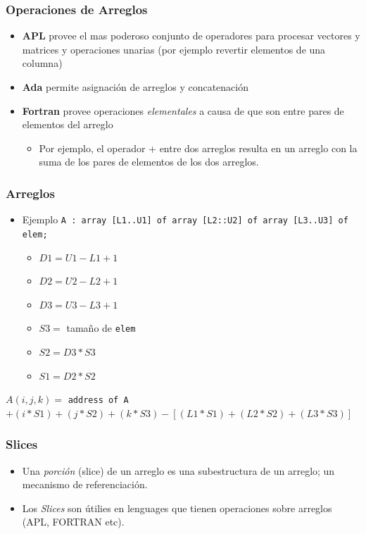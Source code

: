 \documentclass[11pt]{article}
\begin{document}
\subsubsection*{Operaciones de Arreglos}
\label{sec:orgheadline24}
\begin{itemize}
\item \textbf{APL} provee el mas poderoso conjunto de operadores para procesar
vectores y matrices y operaciones unarias (por ejemplo revertir
elementos de una columna)
\item \textbf{Ada} permite asignación de arreglos y concatenación
\item \textbf{Fortran} provee operaciones \emph{elementales} a causa de que son entre
pares de elementos del arreglo
\begin{itemize}
\item Por ejemplo, el operador + entre dos arreglos resulta en un
arreglo con la suma de los pares de elementos de los dos arreglos.
\end{itemize}
\end{itemize}

\subsubsection*{Arreglos}
\label{sec:orgheadline25}
\begin{itemize}
\item Ejemplo \texttt{A : array [L1..U1] of array [L2::U2] of array [L3..U3] of elem;}
\begin{itemize}
\item \(D1 = U1 - L1 + 1\)
\item \(D2 = U2 - L2 + 1\)
\item \(D3 = U3 - L3 + 1\)
\item \(S3 =\) tamaño de \texttt{elem}
\item \(S2 = D3 * S3\)
\item \(S1 = D2 * S2\)
\end{itemize}
\end{itemize}

\(A(i,j,k) =\) \texttt{address of A} \(+ (i * S1) + (j * S2) + (k * S3)  -
[(L1 * S1) + (L2 * S2) + (L3 * S3)]\)


\subsubsection*{Slices}
\label{sec:orgheadline26}
\begin{itemize}
\item Una \emph{porción} (slice) de un arreglo es una subestructura de un
arreglo; un mecanismo de referenciación.
\item Los \emph{Slices} son útilies en lenguages que tienen operaciones sobre
arreglos (APL, FORTRAN etc).
\end{itemize}
\end{document}
